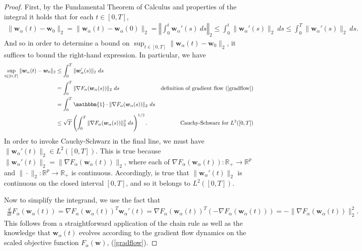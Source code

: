\documentclass{article}
\begin{document}
\begin{proof}
First, by the Fundamental Theorem of Calculus and properties of the integral it holds that for each $t \in [0, T]$,
\begin{align*}
    \|\boldsymbol{w}_{\alpha}(t) - \boldsymbol{w}_{0} \|_2 = \|\boldsymbol{w}_{\alpha}(t) - \boldsymbol{w}_{\alpha}(0) \|_2 = \left\Vert \int_0^t \boldsymbol{w}_{\alpha}'(s) \ ds  \right\Vert_2 \leq  \int_0^t \| \boldsymbol{w}_{\alpha}'(s) \|_2 \ ds \leq \int_0^T \| \boldsymbol{w}_{\alpha}'(s) \|_2 \ ds.
\end{align*}
And so in order to determine a bound on $\sup_{t \in [0, T]} \|\boldsymbol{w}_{\alpha}(t) - \boldsymbol{w}_0 \|_2$, it suffices to bound the right-hand expression. In particular, we have
\begin{align*}
    \sup_{t \in [0, T]} \|\boldsymbol{w}_{\alpha}(t) - \boldsymbol{w}_0 \|_2 &\leq \int_0^T \| \boldsymbol{w}_{\alpha}'(s) \|_2 \ ds\\
    &=\int_0^T \| \nabla F_{\alpha}(\boldsymbol{w}_{\alpha}(s)) \|_2 \ ds & \text{definition of gradient flow (\ref{gradflow})}\\
    &= \int_0^T \mathbbm{1} \cdot \| \nabla F_{\alpha}(\boldsymbol{w}_{\alpha}(s)) \|_2 \ ds \\
    &\leq \sqrt{T} \left( \int_0^T \| \nabla F_{\alpha}(\boldsymbol{w}_{\alpha}(s)) \|_2^2 \ ds \right)^{1/2}. & \text{Cauchy-Schwarz for $L^2([0, T])$}
\end{align*}
In order to invoke Cauchy-Schwarz in the final line, we must have $ \|\boldsymbol{w}_{\alpha}'(t) \|_2 \in L^2([0, T])$. This is true because $\| \boldsymbol{w}_{\alpha}'(t) \|_2 = \| \nabla F_{\alpha}(\boldsymbol{w}_{\alpha}(t)) \|_2$, where each of $\nabla F_{\alpha}(\boldsymbol{w}_{\alpha}(t)): \mathbb{R}_+ \rightarrow \mathbb{R}^p$ and $\| \cdot \|_2: \mathbb{R}^p \rightarrow \mathbb{R}_+$ is continuous. Accordingly, is true that $\|\boldsymbol{w}_{\alpha}'(t) \|_2$ is continuous on the closed interval $[0, T]$, and so it belongs to $L^2([0, T])$.

Now to simplify the integrand, we use the fact that 
\begin{align*}
\frac{d}{dt}F_{\alpha}(\boldsymbol{w}_{\alpha}(t)) = \nabla F_{\alpha}(\boldsymbol{w}_{\alpha}(t))^T \boldsymbol{w}_{\alpha}'(t) = \nabla F_{\alpha}(\boldsymbol{w}_{\alpha}(t))^T (- \nabla F_{\alpha}(\boldsymbol{w}_{\alpha}(t))) = - \| \nabla F_{\alpha}(\boldsymbol{w}_{\alpha}(t))\|_2^2.
\end{align*}
This follows from a straightforward application of the chain rule as well as the knowledge that $\boldsymbol{w}_{\alpha}(t)$ evolves according to the gradient flow dynamics on the scaled objective function $F_{\alpha}(\boldsymbol{w})$, (\ref{gradflow}).


\end{proof}
\end{document}
